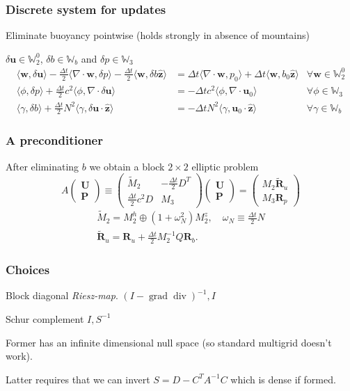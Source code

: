 \documentclass[presentation]{beamer}
\renewcommand{\vec}[1]{\ensuremath{\boldsymbol{#1}}}
\newcommand{\zhat}{\hat{\vec{z}}}
\newcommand{\W}{\ensuremath{\mathbb{W}}}
\DeclareMathOperator{\Grad}{grad}
\DeclareMathOperator{\Div}{div}
\begin{document}
\begin{frame}
  \frametitle{Discrete system for updates}
Eliminate buoyancy pointwise (holds strongly in absence of mountains)

$\delta \vec{u}\in \W_2^0$, $\delta b\in\W_b$ and
$\delta p\in\W_3$
\begin{align*}
  \langle\vec{w},\delta\vec{u}\rangle
  - \frac{\Delta t}{2}\langle\nabla\cdot\vec{w},\delta p\rangle
  - \frac{\Delta t}{2}\langle\vec{w},\delta b\zhat\rangle
  &= \Delta t \langle\nabla\cdot\vec{w},p_0\rangle
  + \Delta t \langle\vec{w},b_0\zhat\rangle
   &\forall \vec{w}\in\W_2^0
 \\
  \langle\phi,\delta p\rangle
  +\frac{\Delta t}{2}c^2\langle\phi,\nabla\cdot\delta\vec{u}\rangle
  &= -\Delta tc^2\langle\phi,\nabla\cdot\vec{u}_0\rangle
   &\forall \phi\in\W_3
  \\
  \langle\gamma,\delta b\rangle
  + \frac{\Delta t }{2}N^2\langle\gamma,\delta\vec{u}\cdot\zhat\rangle
  &= -\Delta t N^2\langle\gamma,\vec{u}_0\cdot\zhat\rangle
   &\forall \gamma\in\W_b
\end{align*}
\end{frame}

\begin{frame}
  \frametitle{A preconditioner}
  After eliminating $b$ we obtain a block $2\times2$ elliptic problem
\begin{equation}
  A\begin{pmatrix}\vec{U}\\[1ex]\vec{P}\end{pmatrix}
  \equiv
  \begin{pmatrix}
   \tilde{M}_2 & -\frac{\Delta t}{2}D^T  \\[1ex]
   \frac{\Delta t}{2}c^2 D & M_3
  \end{pmatrix}
  \begin{pmatrix}\vec{U}\\[1ex]\vec{P}\end{pmatrix}
 =
\begin{pmatrix}M_2\tilde{\vec{R}}_u\\[1ex]M_3\vec{R}_p\end{pmatrix}
\end{equation}
\begin{equation}
  \label{eq:2}
\begin{matrix}
\tilde{M}_2 = M_2^h \oplus (1+ \omega_N^2) M_2^z, \quad \omega_N \equiv \frac{\Delta t}{2}N
\\[1ex]
\tilde{\vec{R}}_u = \vec{R}_u+\frac{\Delta t}{2}M_2^{-1}Q\vec{R}_b.
\end{matrix}
\end{equation}
\end{frame}
\begin{frame}
  \frametitle{Choices}
  Block diagonal \emph{Riesz-map}.  $(I - \Grad\Div)^{-1}, I$

  Schur complement $I, S^{-1}$

  Former has an infinite dimensional null space (so standard multigrid
  doesn't work).

  Latter requires that we can invert $S = D - C^T A^{-1} C$ which is
  dense if formed.
\end{frame}
\end{document}
